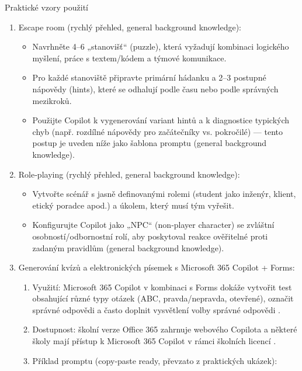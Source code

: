 \documentclass{report}%
\begin{document}
Praktické vzory použití
\begin{enumerate}
  \item Escape room (rychlý přehled, general background knowledge):
    \begin{itemize}
      \item Navrhněte 4–6 „stanovišť“ (puzzle), která vyžadují kombinaci logického myšlení, práce s textem/kódem a týmové komunikace.
      \item Pro každé stanoviště připravte primární hádanku a 2–3 postupné nápovědy (hints), které se odhalují podle času nebo podle správných mezikroků.
      \item Použijte Copilot k vygenerování variant hintů a k diagnostice typických chyb (např. rozdílné nápovědy pro začátečníky vs. pokročilé) — tento postup je uveden níže jako šablona promptu (general background knowledge).
    \end{itemize}

  \item Role‑playing (rychlý přehled, general background knowledge):
    \begin{itemize}
      \item Vytvořte scénář s jasně definovanými rolemi (student jako inženýr, klient, etický poradce apod.) a úkolem, který musí tým vyřešit.
      \item Konfigurujte Copilot jako „NPC“ (non‑player character) se zvláštní osobností/odbornostní rolí, aby poskytoval reakce ověřitelné proti zadaným pravidlům (general background knowledge).
    \end{itemize}

  \item Generování kvízů a elektronických písemek s Microsoft 365 Copilot + Forms:
    \begin{enumerate}
      \item Využití: Microsoft 365 Copilot v kombinaci s Forms dokáže vytvořit test obsahující různé typy otázek (ABC, pravda/nepravda, otevřené), označit správné odpovědi a často doplnit vysvětlení volby správné odpovědi \cite{kb_ai_101_tipu_pdf_04e4a115_page_36_1}.
      \item Dostupnost: školní verze Office 365 zahrnuje webového Copilota a některé školy mají přístup k Microsoft 365 Copilot v rámci školních licencí \cite{kb_ai_101_tipu_pdf_04e4a115_page_3_1}.
      \item Příklad promptu (copy‑paste ready, převzato z praktických ukázek):
        \begin{quote}
          

\end{quote}
\end{enumerate}
\end{enumerate}
\end{document}
